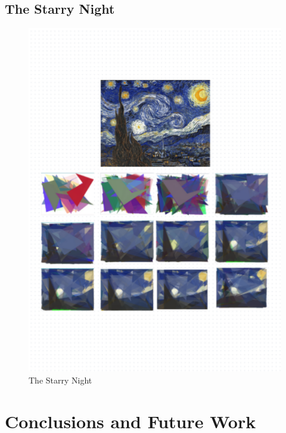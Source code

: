 \section{The Starry Night}
\begin{figure}
\centering
\includegraphics[width=5in,height=6in]{images/7a 3.png}
\caption{The Starry Night}
\end{figure}
\clearpage

\chapter{Conclusions and Future Work }
\label{conclusions-and-future-work}

